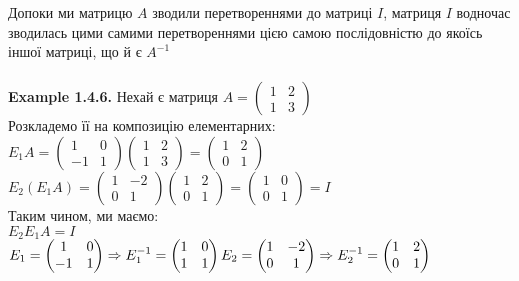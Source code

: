 \documentclass[a4paper, 14pt]{extarticle}
\def\ex#1{\textbf{Example {#1}}}
\def\bigline{\vspace{5mm}\\}
\begin{document}
	Допоки ми матрицю $A$ зводили перетвореннями до матриці $I$, матриця $I$ водночас зводилась цими самими перетвореннями цією самою послідовністю до якоїсь іншої матриці, що й є $A^{-1}$\\
	\bigline
	\ex{1.4.6.} Нехай є матриця $A = \begin{pmatrix} 1 & 2 \\ 1 & 3 \end{pmatrix}$\\
	Розкладемо її на композицію елементарних:\\
	$E_1 A = \begin{pmatrix}1 & 0 \\ -1 & 1 \end{pmatrix} \begin{pmatrix}1 & 2 \\ 1 & 3 \end{pmatrix} = \begin{pmatrix} 1 & 2 \\ 0 & 1 \end{pmatrix}$\\
	$E_2 (E_1 A) = \begin{pmatrix} 1 & -2 \\ 0 & 1 \end{pmatrix} \begin{pmatrix} 1 & 2 \\ 0 & 1 \end{pmatrix} = \begin{pmatrix}
	1 & 0 \\
	0 & 1
	\end{pmatrix} = I$\\
	Таким чином, ми маємо:\\
	$E_2 E_1 A = I$\\
	$E_1 = \begin{pmatrix}
	1 & 0 \\
	-1 & 1
	\end{pmatrix} \Rightarrow E_1^{-1} = \begin{pmatrix}
	1 & 0 \\
	1 & 1
\end{pmatrix}	 \\ E_2 = \begin{pmatrix}
	1 & -2 \\
	0 & 1
	\end{pmatrix} \Rightarrow E_2^{-1} = \begin{pmatrix}
	1 & 2 \\
	0 & 1
	\end{pmatrix}$\\
\end{document}
